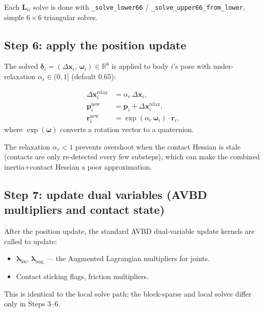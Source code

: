 \documentclass[11pt,a4paper]{article}
\begin{document}
Each $\mathbf{L}_{ii}$ solve is done with \texttt{\_solve\_lower66} /
\texttt{\_solve\_upper66\_from\_lower}, simple $6\times 6$ triangular solves.

\subsection{Step 6: apply the position update}
\label{sec:update}

The solved $\boldsymbol{\delta}_i = (\Delta\mathbf{x}_i,\,
\boldsymbol{\omega}_i) \in \mathbb{R}^6$ is applied to body $i$'s pose with
under-relaxation $\alpha_r \in (0, 1]$ (default $0.65$):

\begin{align}
  \Delta\mathbf{x}_i^\text{relax} &= \alpha_r \,\Delta\mathbf{x}_i, \\
  \mathbf{p}_i^\text{new} &= \mathbf{p}_i + \Delta\mathbf{x}_i^\text{relax}, \\
  \mathbf{r}_i^\text{new} &= \exp(\alpha_r\,\boldsymbol{\omega}_i) \cdot \mathbf{r}_i,
\end{align}
where $\exp(\boldsymbol{\omega})$ converts a rotation vector to a quaternion.

The relaxation $\alpha_r < 1$ prevents overshoot when the contact Hessian is
stale (contacts are only re-detected every few substeps), which can make the
combined inertia+contact Hessian a poor approximation.

\subsection{Step 7: update dual variables (AVBD multipliers and contact state)}

After the position update, the standard AVBD dual-variable update kernels
are called to update:
\begin{itemize}[nosep]
  \item $\boldsymbol{\lambda}_\text{lin}$, $\boldsymbol{\lambda}_\text{ang}$ —
        the Augmented Lagrangian multipliers for joints.
  \item Contact sticking flags, friction multipliers.
\end{itemize}
This is identical to the local solve path; the block-sparse and local solves
differ only in Steps 3--6.

\end{document}
